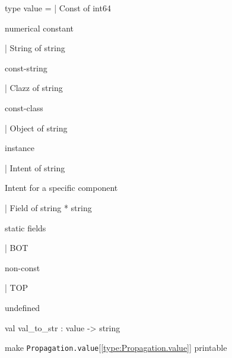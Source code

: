 \documentclass[11pt]{article}
\begin{document}
\label{type:Propagation.value}\begin{ocamldoccode}
type value =
  | Const of int64
\end{ocamldoccode}
\begin{ocamldoccomment}
numerical constant
\end{ocamldoccomment}
\begin{ocamldoccode}
  | String of string
\end{ocamldoccode}
\begin{ocamldoccomment}
const-string
\end{ocamldoccomment}
\begin{ocamldoccode}
  | Clazz of string
\end{ocamldoccode}
\begin{ocamldoccomment}
const-class
\end{ocamldoccomment}
\begin{ocamldoccode}
  | Object of string
\end{ocamldoccode}
\begin{ocamldoccomment}
instance
\end{ocamldoccomment}
\begin{ocamldoccode}
  | Intent of string
\end{ocamldoccode}
\begin{ocamldoccomment}
Intent for a specific component
\end{ocamldoccomment}
\begin{ocamldoccode}
  | Field of string * string
\end{ocamldoccode}
\begin{ocamldoccomment}
static fields
\end{ocamldoccomment}
\begin{ocamldoccode}
  | BOT
\end{ocamldoccode}
\begin{ocamldoccomment}
non-const
\end{ocamldoccomment}
\begin{ocamldoccode}
  | TOP
\end{ocamldoccode}
\begin{ocamldoccomment}
undefined
\end{ocamldoccomment}




\label{val:Propagation.val-underscoreto-underscorestr}\begin{ocamldoccode}
val val_to_str : value -> string
\end{ocamldoccode}
\begin{ocamldocdescription}
make {\tt{Propagation.value}}[\ref{type:Propagation.value}] printable


\end{ocamldocdescription}
\end{document}

